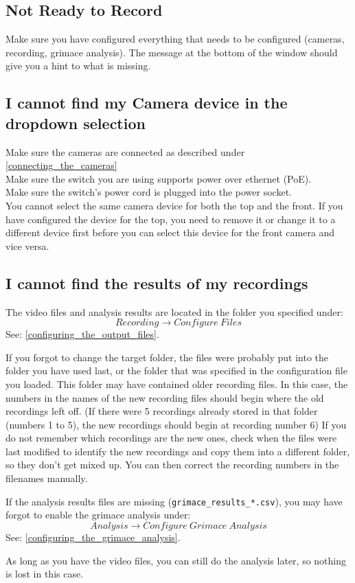 \subsection{Not Ready to Record}
Make sure you have configured everything that needs to be configured (cameras, recording, grimace analysis).
The message at the bottom of the window should give you a hint to what is missing.

\subsection{I cannot find my Camera device in the dropdown selection}
Make sure the cameras are connected as described under \ref{connecting_the_cameras}\\
Make sure the switch you are using supports power over ethernet (PoE).\\
Make sure the switch's power cord is plugged into the power socket.\\
You cannot select the same camera device for both the top and the front.
If you have configured the device for the top, you need to remove it or change it to a different device first before you can select this device for the front camera and vice versa.

\subsection{I cannot find the results of my recordings}
The video files and analysis results are located in the folder you specified under: \[Recording \rightarrow Configure\ Files\]
See: \ref{configuring_the_output_files}.

If you forgot to change the target folder, the files were probably put into the folder you have used last,
or the folder that was specified in the configuration file you loaded.
This folder may have contained older recording files.
In this case, the numbers in the names of the new recording files should begin where the old recordings left off.
(If there were 5 recordings already stored in that folder (numbers 1 to 5), the new recordings should begin at recording number 6)
If you do not remember which recordings are the new ones, check when the files were last modified to identify
the new recordings and copy them into a different folder, so they don't get mixed up.
You can then correct the recording numbers in the filenames manually.

If the analysis results files are missing (\verb!grimace_results_*.csv!), you may have forgot to enable the grimace analysis under: \[Analysis \rightarrow Configure\ Grimace\ Analysis\]
See: \ref{configuring_the_grimace_analysis}.

As long as you have the video files, you can still do the analysis later, so nothing is lost in this case.
